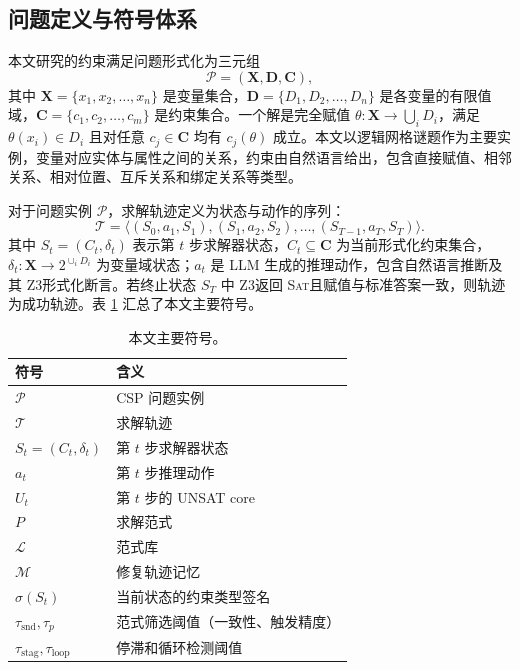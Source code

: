 \documentclass[UTF8,a4paper,12pt]{ctexart}
\newcommand{\sat}{\textsc{Sat}}
\newcommand{\zthree}{Z3}
\begin{document}
\subsection{问题定义与符号体系}

本文研究的约束满足问题形式化为三元组
\begin{equation}
  \mathcal{P}=(\mathbf{X},\mathbf{D},\mathbf{C}),
\end{equation}
其中 \(\mathbf{X}=\{x_1,x_2,\ldots,x_n\}\) 是变量集合，\(\mathbf{D}=\{D_1,D_2,\ldots,D_n\}\) 是各变量的有限值域，\(\mathbf{C}=\{c_1,c_2,\ldots,c_m\}\) 是约束集合。一个解是完全赋值 \(\theta:\mathbf{X}\to \bigcup_i D_i\)，满足 \(\theta(x_i)\in D_i\) 且对任意 \(c_j\in\mathbf{C}\) 均有 \(c_j(\theta)\) 成立。本文以逻辑网格谜题作为主要实例，变量对应实体与属性之间的关系，约束由自然语言给出，包含直接赋值、相邻关系、相对位置、互斥关系和绑定关系等类型。

对于问题实例 \(\mathcal{P}\)，求解轨迹定义为状态与动作的序列：
\begin{equation}
  \mathcal{T}=\langle (S_0,a_1,S_1),(S_1,a_2,S_2),\ldots,(S_{T-1},a_T,S_T)\rangle .
\end{equation}
其中 \(S_t=(C_t,\delta_t)\) 表示第 \(t\) 步求解器状态，\(C_t\subseteq\mathbf{C}\) 为当前形式化约束集合，\(\delta_t:\mathbf{X}\to2^{\cup_i D_i}\) 为变量域状态；\(a_t\) 是 LLM 生成的推理动作，包含自然语言推断及其 \zthree 形式化断言。若终止状态 \(S_T\) 中 \zthree 返回 \sat 且赋值与标准答案一致，则轨迹为成功轨迹。表 \ref{tab:symbols} 汇总了本文主要符号。

\begin{table}[t]
  \centering
  \caption{本文主要符号。}
  \label{tab:symbols}
  \begin{tabular}{ll}
    \toprule
    符号 & 含义 \\
    \midrule
    \(\mathcal{P}\) & CSP 问题实例 \\
    \(\mathcal{T}\) & 求解轨迹 \\
    \(S_t=(C_t,\delta_t)\) & 第 \(t\) 步求解器状态 \\
    \(a_t\) & 第 \(t\) 步推理动作 \\
    \(U_t\) & 第 \(t\) 步的 UNSAT core \\
    \(P\) & 求解范式 \\
    \(\mathcal{L}\) & 范式库 \\
    \(\mathcal{M}\) & 修复轨迹记忆 \\
    \(\sigma(S_t)\) & 当前状态的约束类型签名 \\
    \(\tau_{\text{snd}},\tau_p\) & 范式筛选阈值（一致性、触发精度） \\
    \(\tau_{\text{stag}},\tau_{\text{loop}}\) & 停滞和循环检测阈值 \\
    \bottomrule
  \end{tabular}
\end{table}
\end{document}
